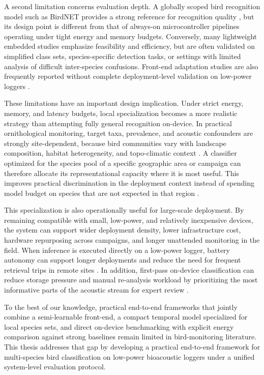 \documentclass[a4paper,singleside,12pt]{report} %
\begin{document}
	A second limitation concerns evaluation depth. A globally scoped bird recognition model such as BirdNET provides a strong reference for recognition quality \cite{birdnet2021}, but its design point is different from that of always-on microcontroller pipelines operating under tight energy and memory budgets. Conversely, many lightweight embedded studies emphasize feasibility and efficiency, but are often validated on simplified class sets, species-specific detection tasks, or settings with limited analysis of difficult inter-species confusions. Front-end adaptation studies are also frequently reported without complete deployment-level validation on low-power loggers \cite{zeghidour2021leaf,peictukuljac2022learnable,caiko2023parametric}.

	These limitations have an important design implication. Under strict energy, memory, and latency budgets, local specialization becomes a more realistic strategy than attempting fully general recognition on-device. In practical ornithological monitoring, target taxa, prevalence, and acoustic confounders are strongly site-dependent, because bird communities vary with landscape composition, habitat heterogeneity, and topo-climatic context \cite{birdnet2021,anderle2025drivers}. A classifier optimized for the species pool of a specific geographic area or campaign can therefore allocate its representational capacity where it is most useful. This improves practical discrimination in the deployment context instead of spending model budget on species that are not expected in that region \cite{birdnet2021}.

	This specialization is also operationally useful for large-scale deployment. By remaining compatible with small, low-power, and relatively inexpensive devices, the system can support wider deployment density, lower infrastructure cost, hardware repurposing across campaigns, and longer unattended monitoring in the field. When inference is executed directly on a low-power logger, battery autonomy can support longer deployments and reduce the need for frequent retrieval trips in remote sites \cite{audiomoth2019,tinychirp2024}. In addition, first-pass on-device classification can reduce storage pressure and manual re-analysis workload by prioritizing the most informative parts of the acoustic stream for expert review \cite{gallacher2021shazam,sabbella2022alwayson}.

	To the best of our knowledge, practical end-to-end frameworks that jointly combine a semi-learnable front-end, a compact temporal model specialized for local species sets, and direct on-device benchmarking with explicit energy comparison against strong baselines remain limited in bird-monitoring literature. This thesis addresses that gap by developing a practical end-to-end framework for multi-species bird classification on low-power bioacoustic loggers under a unified system-level evaluation protocol.
\end{document}
